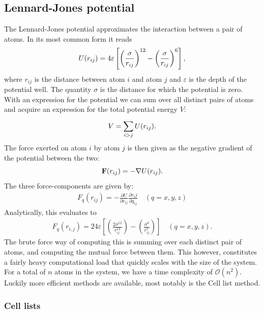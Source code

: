 \documentclass[a4paper]{article}
\renewcommand{\vec}[1]{\mathbf{#1}}
\begin{document}
\subsection{Lennard-Jones potential}
\label{sub:lennard_jones_potential}

    The Lennard-Jones potential approximates the interaction between a pair of
    atoms. In its most common form it reads
    \begin{equation}
        \notag U(r_{ij}) = 4\varepsilon \left[ \left( \frac{\sigma}{r_{ij}}
        \right)^{12} - \left( \frac{\sigma}{r_{ij}} \right)^6 \right],
    \end{equation}
    where $r_{ij}$ is the distance between atom $i$ and atom $j$ and
    $\varepsilon$ is the depth of the potential well. The quantity $\sigma$ is
    the distance for which the potential is zero.  With an expression for the
    potential we can sum over all distinct pairs of atoms and acquire an
    expression for the total potential energy $V$:
    \begin{equation}
        \notag V = \sum^{}_{i>j}U(r_{ij}).
    \end{equation}
    The force exerted on atom $i$ by atom $j$ is then given as the negative
    gradient of the potential between the two:
    \begin{equation}
        \notag \vec{F}(r_{ij}) = -\nabla U(r_{ij}).
    \end{equation}
    The three force-components are given by:
    \begin{align*}
        F_q(r_{ij}) = -\frac{\partial U}{\partial r_{ij}} \frac{\partial
        r_ij}{\partial q_{ij}} \quad (q = x, y, z)
    \end{align*}
    Analytically, this evaluates to
    \begin{align*}
        F_q(r_{i, j}) = 24\varepsilon \left[ \left(
        \frac{2\sigma^{12}}{r_{ij}^{13}}\right) - \left(
        \frac{\sigma^6}{r_{ij}^7}\right)\right] \quad (q = x, y, z).
    \end{align*}
    The brute force way of computing this is summing over each distinct pair of
    atoms, and computing the mutual force between them. This however,
    constitutes a fairly heavy computational load that quickly scales with the
    size of the system. For a total of $n$ atoms in the system, we have a time
    complexity of $\mathcal{O}(n^2)$. Luckily more efficient methods are
    available, most notably is the Cell list method. 

    \subsubsection{Cell lists}
    \label{ssub:cell_lists}
    
\end{document}
